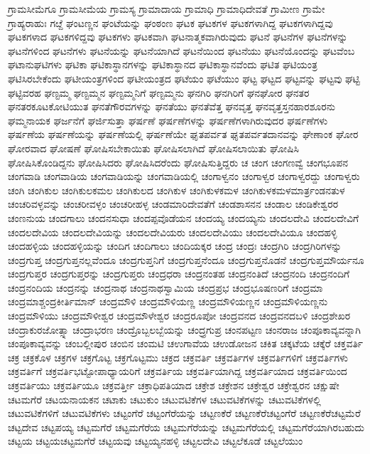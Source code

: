 {ಗ್ರಾಮಸೀಮೆಗೂ
ಗ್ರಾಮಸೀಮೆಯ
ಗ್ರಾಮಸ್ಯ
ಗ್ರಾಮಾದಾಯ
ಗ್ರಾಮಾಧಿ
ಗ್ರಾಮಾಧಿದೇವತೆ
ಗ್ರಾಮೀಣ
ಗ್ರಾಮೇ
ಗ್ರಾಹ್ಯರಾಹುಃ
ಗೞ್ದೆ
ಘಂಟಣ್ಣನ
ಘಂಟೆಯನ್ನು
ಘಂಠಂಣ
ಘಟಕ
ಘಟಕಗಳ
ಘಟಕಗಳಾಗಿದ್ದ
ಘಟಕಗಳಾಗಿದ್ದವು
ಘಟಕಗಳಾದ
ಘಟಕಗಳಿದ್ದವು
ಘಟಕಗಳು
ಘಟಕವಾಗಿ
ಘಟನಾತ್ಮಕವಾಗಿರುವುದು
ಘಟನೆ
ಘಟನೆಗಳ
ಘಟನೆಗಳನ್ನು
ಘಟನೆಗಳಿಂದ
ಘಟನೆಗಳು
ಘಟನೆಯನ್ನು
ಘಟನೆಯಾಗಿದೆ
ಘಟನೆಯಿಂದ
ಘಟನೆಯು
ಘಟನೆಯೊಂದನ್ನು
ಘಟವೆಂಬ
ಘಟಾನುಘಟಿಗಳು
ಘಟಿಕಾ
ಘಟಿಕಾಸ್ಥಾನಗಳನ್ನು
ಘಟಿಕಾಸ್ಥಾನದ
ಘಟಿಕಾಸ್ಥಾನವೆಂದು
ಘಟಿತ
ಘಟಿಯಂತ್ರ
ಘಟಿಸಿರಬೇಕೆಂದು
ಘಟೀಯಂತ್ರಗಳಿಂದ
ಘಟೀಯಂತ್ರದ
ಘಟೆಯಂ
ಘಟೆಯುಂ
ಘಟ್ಟ
ಘಟ್ಟದ
ಘಟ್ಟವನ್ನು
ಘಟ್ಟವು
ಘಟ್ಟಿ
ಘಟ್ಟಿವರಹ
ಘಣ್ಟಮ್ಮ
ಘಣ್ಟಮ್ಮನ
ಘಣ್ಟಮ್ಮನಿಗೆ
ಘಣ್ಟಮ್ಮನು
ಘನಗಿರಿ
ಘನಗಿರಿಗೆ
ಘನಘೋರ
ಘನತರ
ಘನತರಕೂಟಕೋಟಿಯುತ
ಘನತೆಗೌರವಗಳನ್ನು
ಘನತೆಯು
ಘನತೆವೆತ್ತ
ಘನವೃತ್ತ
ಘನವೃತ್ತಸ್ತನಹಾರಶೂರನು
ಘಮ್ಮನಾಯಕ
ಘರ್ಜನೆಗೆ
ಘರ್ಜಿಸುತ್ತಾ
ಘರ್ಷಣೆ
ಘರ್ಷಣೆಗಳನ್ನು
ಘರ್ಷಣೆಗಳಾಗಿರುವುದರ
ಘರ್ಷಣೆಗಳು
ಘರ್ಷಣೆಯ
ಘರ್ಷಣೆಯನ್ನು
ಘರ್ಷಣೆಯಲ್ಲಿ
ಘರ್ಷಣೆಯೇ
ಘೃತಪರ್ವತ
ಘೃತಪರ್ವತದಾನವನ್ನು
ಘೇಣಾಂಕ
ಘೋರ
ಘೋರವಾದ
ಘೋಷಣೆ
ಘೋಷಿಸಬೇಕಾಯಿತು
ಘೋಷಿಸಲಾಗಿದೆ
ಘೋಷಿಸಲಾಯಿತು
ಘೋಷಿಸಿ
ಘೋಷಿಸಿಕೊಂಡಿದ್ದನು
ಘೋಷಿಸಿದರು
ಘೋಷಿಸಿದರೆಂದು
ಘೋಷಿಸುತ್ತಿದ್ದರು
ಚ
ಚಂಗ
ಚಂಗಣವ್ವೆ
ಚಂಗಭೂಪನ
ಚಂಗವಾಡಿ
ಚಂಗವಾಡಿಯ
ಚಂಗವಾಡಿಯನ್ನು
ಚಂಗವಾಡಿಯಲ್ಲಿ
ಚಂಗಾಳ್ವನಂ
ಚಂಗಾಳ್ವರ
ಚಂಗಾಳ್ವರದ್ದು
ಚಂಗಾಳ್ವರು
ಚಂಗಿ
ಚಂಗಿಕುಲ
ಚಂಗಿಕುಲಕಮಲ
ಚಂಗಿಕುಲದ
ಚಂಗಿಕುಳ
ಚಂಗಿಕುಳಕಮಳ
ಚಂಗಿಕುಳಕಮಳಮಾರ್ತ್ರಂಡನತುಳ
ಚಂಚರಿವಳ್ಳವನ್ನು
ಚಂಚರೀವಳ್ಳಂ
ಚಂಚರೀಹಳ್ಳ
ಚಂಡಮಾರಿದೇವತೆಗೆ
ಚಂಡಶಾಸನನ
ಚಂಡಾಲ
ಚಂಡಿಕೇಶ್ವರರ
ಚಂಣನುಯ
ಚಂದಗಾಲು
ಚಂದನಸುಧಾ
ಚಂದಪ್ಪವೊಡೆಯನ
ಚಂದಯ್ಯ
ಚಂದಯ್ಯನು
ಚಂದಲದೇವಿ
ಚಂದಲದೇವಿಗೆ
ಚಂದಲದೇವಿಯ
ಚಂದಲದೇವಿಯನ್ನು
ಚಂದಲದೇವಿಯರು
ಚಂದಲದೇವಿಯು
ಚಂದಲದೇವಿಯೂ
ಚಂದಹಳ್ಳಿ
ಚಂದಹಳ್ಳಿಯ
ಚಂದಹಳ್ಳಿಯನ್ನು
ಚಂದಿಗ
ಚಂದಿಗಾಲು
ಚಂದಿಯಕ್ಕರ
ಚಂದ್ರ
ಚಂದ್ರಃ
ಚಂದ್ರಗಿರಿ
ಚಂದ್ರಗಿರಿಗಳನ್ನು
ಚಂದ್ರಗುಪ್ತ
ಚಂದ್ರಗುಪ್ತನಲ್ಲವೆಂದೂ
ಚಂದ್ರಗುಪ್ತನಿಗೆ
ಚಂದ್ರಗುಪ್ತನೆಂದೂ
ಚಂದ್ರಗುಪ್ತನೊಡನೆ
ಚಂದ್ರಗುಪ್ತಮೌರ್ಯನೂ
ಚಂದ್ರಗುಪ್ತರ
ಚಂದ್ರಗುಪ್ತರನ್ನು
ಚಂದ್ರಗುಪ್ತರು
ಚಂದ್ರಧರಾ
ಚಂದ್ರನಂತಹ
ಚಂದ್ರನಂತಿದೆ
ಚಂದ್ರನಂದಿ
ಚಂದ್ರನಂದಿಗೆ
ಚಂದ್ರನಂದಿಯ
ಚಂದ್ರನನ್ನು
ಚಂದ್ರನಾಥ
ಚಂದ್ರನಾಥಸ್ವಾಮಿಯ
ಚಂದ್ರಪ್ರಭ
ಚಂದ್ರಭೂಷಣರಿಗೆ
ಚಂದ್ರಮಾ
ಚಂದ್ರಮಾಶ್ಚಂದ್ರಕೀರ್ತಿಮಾನ್
ಚಂದ್ರಮೌಳಿ
ಚಂದ್ರಮೌಳಿಯಣ್ಣ
ಚಂದ್ರಮೌಳಿಯಣ್ಣನ
ಚಂದ್ರಮೌಳಿಯಣ್ಣನು
ಚಂದ್ರಮೌಳಿಯು
ಚಂದ್ರಮೌಳೀಶ್ವರ
ಚಂದ್ರಮೌಳೇಶ್ವರ
ಚಂದ್ರರೂಪೋ
ಚಂದ್ರವನದ
ಚಂದ್ರವನದಬಳಿ
ಚಂದ್ರಶೇಖರ
ಚಂದ್ರಾಕುರಜೋತ್ಸ್ನಾ
ಚಂದ್ರಾಭರಣ
ಚಂದ್ರೊಬ್ಬಲಬ್ಬೆಯನ್ನು
ಚಂದ್ರ್ರಗುಪ್ರ
ಚಂನಪಟ್ಟಣ
ಚಂನರಾಜ
ಚಂಪೂಕಾವ್ಯವನ್ನಾಗಿ
ಚಂಪೂಕಾವ್ಯವನ್ನು
ಚಂಬಲ್ಲೀಪುರ
ಚಂಬಿನ
ಚಂಮಟಿ
ಚಉಗಾವೆಯ
ಚಉಡೋಜನ
ಚಕಿತ
ಚಕ್ಕಟೆಯ
ಚಕ್ಕೆರೆ
ಚಕ್ತವರ್ತಿ
ಚಕ್ರ
ಚಕ್ರಕೊಳ
ಚಕ್ರಗಳ
ಚಕ್ರಗೊಟ್ಟ
ಚಕ್ರಗೊಟ್ಟಮು
ಚಕ್ರದ
ಚಕ್ರವರ್ತಿ
ಚಕ್ರವರ್ತಿಗಳ
ಚಕ್ರವರ್ತಿಗಳಿಗೆ
ಚಕ್ರವರ್ತಿಗಳು
ಚಕ್ರವರ್ತಿಗೆ
ಚಕ್ರವರ್ತಿಭಟ್ಟೋಪಾಧ್ಯಾಯರಿಗೆ
ಚಕ್ರವರ್ತಿಯ
ಚಕ್ರವರ್ತಿಯಾಗಿದ್ದ
ಚಕ್ರವರ್ತಿಯಾದ
ಚಕ್ರವರ್ತಿಯಿಂದ
ಚಕ್ರವರ್ತಿಯು
ಚಕ್ರವರ್ತಿಯೂ
ಚಕ್ರವರ್ತ್ತೀ
ಚಕ್ರಾಧಿಪತಿಯಾದ
ಚಕ್ರೇಶ
ಚಕ್ರೇಶನ
ಚಕ್ರೇಶ್ವರ
ಚಕ್ರೇಶ್ವರನ
ಚಕ್ಷುಷೇ
ಚಟಮಗೆರೆ
ಚಟಯನಾಯಕನ
ಚಟಾಕು
ಚಟುಕುಂ
ಚಟುವಟಿಕೆಗಳ
ಚಟುವಟಿಕೆಗಳನ್ನು
ಚಟುವಟಿಕೆಗಳಲ್ಲಿ
ಚಟುವಟಿಕೆಗಳಿಗೆ
ಚಟುವಟಿಕೆಗಳು
ಚಟ್ಟಂಗೆರೆ
ಚಟ್ಟಂಗೆರೆಯನ್ನು
ಚಟ್ಟಣಕೆರೆ
ಚಟ್ಟಣಕೆರೆಚಟ್ಟಂಗೆರೆ
ಚಟ್ಟಣಕೆರೆಚಟ್ಟಮೆರೆ
ಚಟ್ಟದೇವ
ಚಟ್ಟಪಯ್ಯ
ಚಟ್ಟಮಗೆರೆ
ಚಟ್ಟಮಗೆರೆಯ
ಚಟ್ಟಮಗೆರೆಯನ್ನು
ಚಟ್ಟಮಗೆರೆಯಲ್ಲಿ
ಚಟ್ಟಮಗೆರೆಯಾಗಿರಬಹುದು
ಚಟ್ಟಯ
ಚಟ್ಟಯಚಟ್ಟಮಗೆರೆ
ಚಟ್ಟಯವು
ಚಟ್ಟಯ್ಯನಹಳ್ಳಿ
ಚಟ್ಟಲದೇವಿ
ಚಟ್ಟಲೆಕೂಡೆ
ಚಟ್ಟಲೆಯುಂ
}
